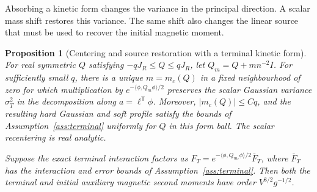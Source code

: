 \documentclass[11pt]{article}
\newtheorem{proposition}[theorem]{Proposition}
\theoremstyle{definition}
\begin{document}
Absorbing a kinetic form changes the variance in the principal
direction. A scalar mass shift restores this variance. The same
shift also changes the linear source that must be used to recover
the initial magnetic moment.

\begin{proposition}[Centering and source restoration with a terminal kinetic form]
\label{prop:kinetic-terminal-absorption}
For real symmetric \(Q\) satisfying \(-qJ_R\le Q\le qJ_R\),
let \(Q_m=Q+m n^{-2}I\). For sufficiently small \(q\), there
is a unique \(m=m_c(Q)\) in a fixed neighbourhood of zero for
which multiplication by
\(e^{-\langle\phi,Q_m\phi\rangle/2}\) preserves the scalar
Gaussian variance \(\sigma_T^2\) in the decomposition along
\(a=\ell^{\mathsf T}\phi\). Moreover, \(|m_c(Q)|\le Cq\),
and the resulting hard Gaussian and soft profile satisfy the
bounds of Assumption~\ref{ass:terminal} uniformly for \(Q\)
in this form ball. The scalar recentering is real analytic.

Suppose the exact terminal interaction factors as
\(F_T=e^{-\langle\phi,Q_{m_c}\phi\rangle/2}\overline F_T\),
where \(\overline F_T\) has the interaction and error
bounds of Assumption~\ref{ass:terminal}. Then both the
terminal and initial auxiliary magnetic second moments have
order \(V^{3/2}g^{-1/2}\).
\end{proposition}
\end{document}
